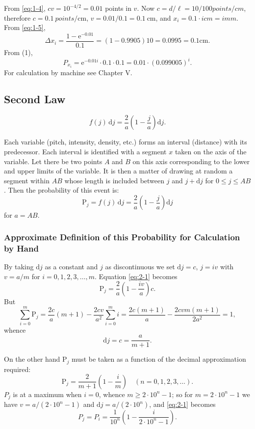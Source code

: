 \documentclass[letterpaper, 11pt]{article}
\begin{document}
From \eqref{eq:1-4}, \( cv = 10^{-4/2} = 0.01 \) points in \( v \). Now \( c = d / \ell = 10 / 100
points/cm \), therefore \( c = \qty{0.1}{points/\cm} \), \( v = 0.01 / 0.1 = \qty{0.1}{\cm} \), and
\( x_i = 0.1 \cdot i cm = i mm \). From \eqref{eq:1-5},
\[\Delta x_i = \frac{1 - \mathrm{e}^{-0.01}}{0.1} = (1 - 0.9905) 10 = 0.0995 = 0.1 \text{cm}. \]
From (1),
\[P_{x_i} = \mathrm{e}^{-0.01i} \cdot 0.1 \cdot 0.1 = 0.01 \cdot (0.099005)^i .\] For calculation by
machine see Chapter V.


\subsection*{Second Law}

\[ f(j) \, \mathrm{d}j = \frac{2}{a} \left( 1 - \frac{j}{a} \right) \mathrm{d}j. \]

Each variable (pitch, intensity, density, etc.) forms an interval (distance) with its predecessor.
Each interval is identified with a segment \( x \) taken on the axis of the variable. Let there be
two points \( A \) and \( B \) on this axis corresponding to the lower and upper limits of the
variable. It is then a matter of drawing at random a segment within \( AB \) whose length is
included between \( j \) and \( j + \mathrm{d} j \) for \( 0 \leq j \leq AB \). Then the probability
of this event is:
\[
    \mathrm{P}_j = f(j) \, \mathrm{d}j = \frac{2}{a} \left( 1 - \frac{j}{a} \right) \mathrm{d}j
    \tag{1}
    \label{eq:2-1}
\]
for \( a = AB \).


\subsubsection*{Approximate Definition of this Probability for Calculation by Hand}

By taking \( \mathrm{d}j \) as a constant and \( j \) as discontinuous we set \( \mathrm{d}j = c \),
\( j = iv \) with \( v = a / m \) for \( i = 0, 1, 2, 3, \dots, m \). Equation \eqref{eq:2-1}
becomes
\[
    \mathrm{P}_j = \frac{2}{a} \left( 1 - \frac{iv}{a} \right) c.
    \tag{2}
    \label{eq:2-2}
\]
But
\[
    \sum_{i=0}^{m} \mathrm{P}_j = \frac{2c}{a} (m + 1) - \frac{2cv}{a^2} \sum_{i=0}^{m} i = \frac{2c (m+1)}{a} - \frac{2cvm (m+1)}{2a^2} = 1,
\]
whence
\[ \mathrm{d}j = c = \frac{a}{m + 1} . \]

On the other hand \( \mathrm{P}_j \) must be taken as a function of the decimal approximation
required:
\[ \mathrm{P}_j = \frac{2}{m + 1} \left( 1 - \frac{i}{m} \right) \quad (n = 0, 1, 2, 3, \dots) . \]
\( P_j \) is at a maximum when \( i = 0 \), whence \( m \geq 2 \cdot 10^n - 1 \); so for \( m = 2
\cdot 10^n - 1 \) we have \( v = a / (2 \cdot 10^n - 1 ) \) and \( \mathrm{d}j = a / (2 \cdot 10^n)
\), and \eqref{eq:2-1} becomes
\[ P_j = P_i = \frac{1}{10^n} \left( 1 - \frac{i}{2 \cdot 10^n - 1} \right). \]
\end{document}
